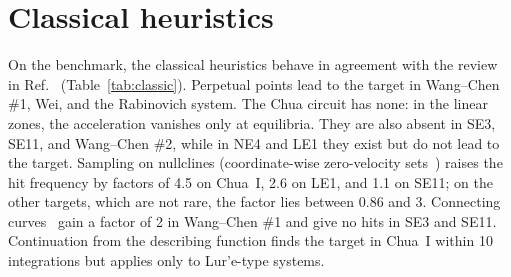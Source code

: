 \section{Classical heuristics}\label{app:classic}

On the benchmark, the classical heuristics behave in agreement with the review in Ref.~\cite{GuanXie2025} (Table~\ref{tab:classic}). Perpetual points lead to the target in Wang--Chen \#1, Wei, and the Rabinovich system. The Chua circuit has none: in the linear zones, the acceleration vanishes only at equilibria. They are also absent in SE3, SE11, and Wang--Chen \#2, while in NE4 and LE1 they exist but do not lead to the target. Sampling on nullclines (coordinate-wise zero-velocity sets~\cite{Godara2018CVS}) raises the hit frequency by factors of 4.5 on Chua~I, 2.6 on LE1, and 1.1 on SE11; on the other targets, which are not rare, the factor lies between 0.86 and 3. Connecting curves~\cite{GuanXie2021CC} gain a factor of 2 in Wang--Chen \#1 and give no hits in SE3 and SE11. Continuation from the describing function finds the target in Chua~I within 10 integrations but applies only to Lur'e-type systems.



